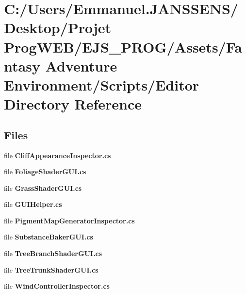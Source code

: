 \section{C\+:/\+Users/\+Emmanuel.J\+A\+N\+S\+S\+E\+N\+S/\+Desktop/\+Projet Prog\+W\+E\+B/\+E\+J\+S\+\_\+\+P\+R\+O\+G/\+Assets/\+Fantasy Adventure Environment/\+Scripts/\+Editor Directory Reference}
\label{dir_e903112364003e304bd1c6de470f1ded}
\subsection*{Files}
\begin{DoxyCompactItemize}
\item 
file \textbf{ Cliff\+Appearance\+Inspector.\+cs}
\item 
file \textbf{ Foliage\+Shader\+G\+U\+I.\+cs}
\item 
file \textbf{ Grass\+Shader\+G\+U\+I.\+cs}
\item 
file \textbf{ G\+U\+I\+Helper.\+cs}
\item 
file \textbf{ Pigment\+Map\+Generator\+Inspector.\+cs}
\item 
file \textbf{ Substance\+Baker\+G\+U\+I.\+cs}
\item 
file \textbf{ Tree\+Branch\+Shader\+G\+U\+I.\+cs}
\item 
file \textbf{ Tree\+Trunk\+Shader\+G\+U\+I.\+cs}
\item 
file \textbf{ Wind\+Controller\+Inspector.\+cs}
\end{DoxyCompactItemize}
